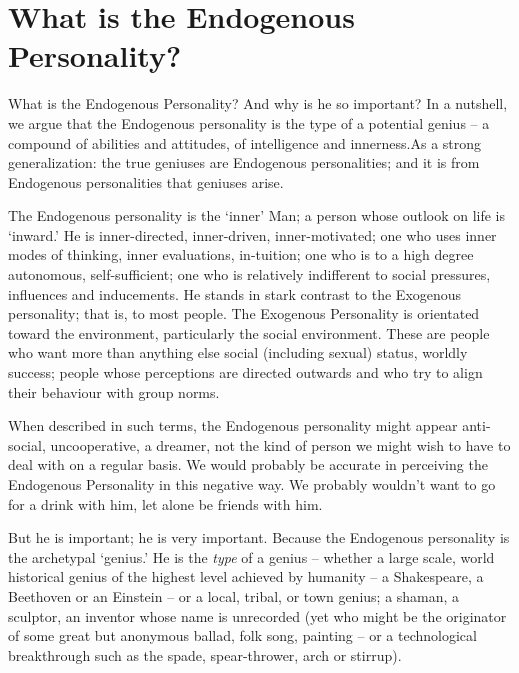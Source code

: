 \documentclass[
]{book}
\begin{document}
\hypertarget{what-is-the-endogenous-personality}{%
\chapter{What is the Endogenous Personality?}\label{what-is-the-endogenous-personality}}

What is the Endogenous Personality? And why is he so important?
In a nutshell, we argue that the Endogenous personality is the type of a potential genius -- a compound of abilities and attitudes, of intelligence and innerness.As a strong generalization: the true geniuses are Endogenous personalities; and it is from Endogenous personalities that geniuses arise.

The Endogenous personality is the `inner' Man; a person whose outlook on life is `inward.' He is inner-directed, inner-driven, inner-motivated; one who uses inner modes of thinking, inner evaluations, in-tuition; one who is to a high degree autonomous, self-sufficient; one who is relatively indifferent to social pressures, influences and inducements.
He stands in stark contrast to the Exogenous personality; that is, to most people. The Exogenous Personality is orientated toward the environment, particularly the social environment. These are people who want more than anything else social (including sexual) status, worldly success; people whose perceptions are directed outwards and who try to align their behaviour with group norms.

When described in such terms, the Endogenous personality might appear anti-social, uncooperative, a dreamer, not the kind of person we might wish to have to deal with on a regular basis. We would probably be accurate in perceiving the Endogenous Personality in this negative way. We probably wouldn't want to go for a drink with him, let alone be friends with him.

But he is important; he is very important. Because the Endogenous personality is the archetypal `genius.' He is the \emph{type} of a genius -- whether a large scale, world historical genius of the highest level achieved by humanity -- a Shakespeare, a Beethoven or an Einstein -- or a local, tribal, or town genius; a shaman, a sculptor, an inventor whose name is unrecorded (yet who might be the originator of some great but anonymous ballad, folk song, painting -- or a technological breakthrough such as the spade, spear-thrower, arch or stirrup).
\end{document}
